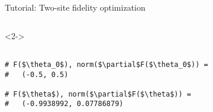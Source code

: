 \begin{frame}[fragile]{Tutorial: Two-site fidelity optimization}
\begin{columns}
\begin{column}{5cm}
\begin{onlyenv}<2->

\begin{lstlisting}[style=julia, numbers=none, mathescape, basicstyle=\small]

# F($\theta_0$), norm($\partial$F($\theta_0$)) =
#   (-0.5, 0.5)

# F($\theta$), norm($\partial$F($\theta$)) =
#   (-0.9938992, 0.07786879)
\end{lstlisting}

\end{onlyenv}

\end{column}

\end{columns}

\end{frame}
